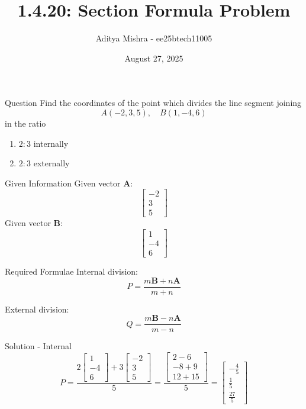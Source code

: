 \documentclass{beamer}
\title{1.4.20: Section Formula Problem}
\author{Aditya Mishra - ee25btech11005}
\date{August 27, 2025}
\begin{document}
\frame{\titlepage}

\begin{frame}{Question}
Find the coordinates of the point which divides the line segment joining
\[
A(-2,3,5), \quad B(1,-4,6)
\]
in the ratio
\begin{enumerate}[label=(\alph*)]
    \item \(2 : 3\) internally
    \item \(2 : 3\) externally
\end{enumerate}
\end{frame}

\begin{frame}{Given Information}
Given vector \(\mathbf{A}\):
\[
\begin{bmatrix} -2 \\ 3 \\ 5 \end{bmatrix}
\]
Given vector \(\mathbf{B}\):
\[
\begin{bmatrix} 1 \\ -4 \\ 6 \end{bmatrix}
\]
\end{frame}

\begin{frame}{Required Formulae}
Internal division:
\[
P = \frac{m \mathbf{B} + n \mathbf{A}}{m + n}
\]

External division:
\[
Q = \frac{m \mathbf{B} - n \mathbf{A}}{m - n}
\]
\end{frame}

\begin{frame}{Solution - Internal}
\[
P = \frac{2 \begin{bmatrix} 1 \\ -4 \\ 6 \end{bmatrix} + 3 \begin{bmatrix} -2 \\ 3 \\ 5 \end{bmatrix}}{5}
= \frac{\begin{bmatrix} 2 - 6 \\ -8 + 9 \\ 12 + 15 \end{bmatrix}}{5}
= \begin{bmatrix} -\frac{4}{5} \\ \frac{1}{5} \\ \frac{27}{5} \end{bmatrix}
\]
\end{frame}
\end{document}
